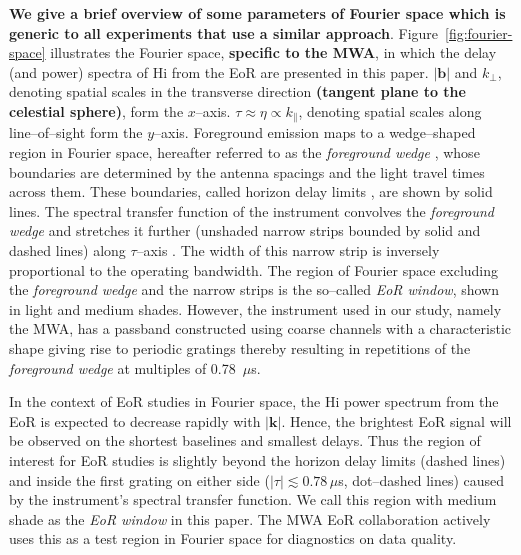 \documentclass[preprint2,iop,numberedappendix]{emulateapj}
\begin{document}
{\bf We give a brief overview of some parameters of Fourier space which is generic to all experiments that use a similar approach}. Figure~\ref{fig:fourier-space} illustrates the Fourier space, {\bf specific to the MWA}, in which the delay (and power) spectra of H{\sc i} from the EoR are presented in this paper. $|\boldsymbol{b}|$ and $k_\perp$, denoting spatial scales in the transverse direction {\bf (tangent plane to the celestial sphere)}, form the $x$--axis. $\tau\approx\eta\propto k_\parallel$, denoting spatial scales along line--of--sight form the $y$--axis. Foreground emission maps to a wedge--shaped region in Fourier space, hereafter referred to as the {\it foreground wedge} \citep{dat10}, whose boundaries are determined by the antenna spacings and the light travel times across them. These boundaries, called horizon delay limits \citep{ved12,par12b}, are shown by solid lines. The spectral transfer function of the instrument convolves the {\it foreground wedge} and stretches it further (unshaded narrow strips bounded by solid and dashed lines) along $\tau$--axis \citep{par12b,thy13}. The width of this narrow strip is inversely proportional to the operating bandwidth. The region of Fourier space excluding the {\it foreground wedge} and the narrow strips is the so--called {\it EoR window}, shown in light and medium shades. However, the instrument used in our study, namely the MWA, has a passband constructed using coarse channels with a characteristic shape giving rise to periodic gratings thereby resulting in repetitions of the {\it foreground wedge} at multiples of 0.78~$\mu$s. 

In the context of EoR studies in Fourier space, the H{\sc i} power spectrum from the EoR is expected to decrease rapidly with $|\boldsymbol{k}|$. Hence, the brightest EoR signal will be observed on the shortest baselines and smallest delays. Thus the region of interest for EoR studies is slightly beyond the horizon delay limits (dashed lines) and inside the first grating on either side ($|\tau| \lesssim 0.78\,\mu$s, dot--dashed lines) caused by the instrument's spectral transfer function. We call this region with medium shade as the {\it EoR window} in this paper. The MWA EoR collaboration actively uses this as a test region in Fourier space for diagnostics on data quality.
\end{document}
